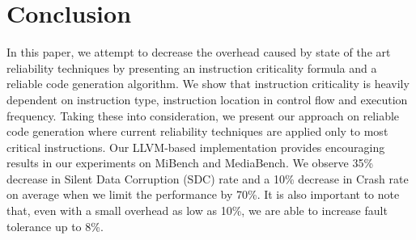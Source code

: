 \section{Conclusion}\label{sec:conclusion} 

In this paper, we attempt to decrease the overhead caused by state of the art reliability techniques by presenting an instruction criticality formula and a reliable code generation algorithm. We show that instruction criticality is heavily dependent on instruction type, instruction location in control flow and execution frequency. Taking these into consideration, we present our approach on reliable code generation where current reliability techniques are applied only to most critical instructions.  Our LLVM-based implementation provides encouraging results in our experiments on MiBench and MediaBench. We observe 35\% decrease in Silent Data Corruption (SDC) rate and a 10\% decrease in Crash rate on average when we limit the performance by 70\%. It is also important to note that, even with a small overhead as low as 10\%, we are able to increase fault tolerance up to 8\%. 
